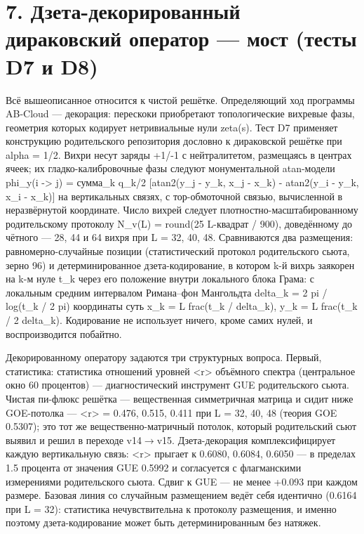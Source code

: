\documentclass[11pt,a4paper]{article}
\begin{document}
\section{7. Дзета-декорированный дираковский оператор --- мост (тесты D7 и D8)}
Всё вышеописанное относится к чистой решётке. Определяющий ход программы AB-Cloud --- декорация: перескоки приобретают топологические вихревые фазы, геометрия которых кодирует нетривиальные нули zeta(s). Тест D7 применяет конструкцию родительского репозитория дословно к дираковской решётке при alpha = 1/2. Вихри несут заряды +1/-1 с нейтралитетом, размещаясь в центрах ячеек; их гладко-калибровочные фазы следуют монументальной atan-модели phi\_\allowbreak{}y(i -> j) = сумма\_\allowbreak{}k q\_\allowbreak{}k/2 [atan2(y\_\allowbreak{}j - y\_\allowbreak{}k, x\_\allowbreak{}j - x\_\allowbreak{}k) - atan2(y\_\allowbreak{}i - y\_\allowbreak{}k, x\_\allowbreak{}i - x\_\allowbreak{}k)] на вертикальных связях, с тор-обмоточной связью, вычисленной в неразвёрнутой координате. Число вихрей следует плотностно-масштабированному родительскому протоколу N\_\allowbreak{}v(L) = round(25 L-квадрат / 900), доведённому до чётного --- 28, 44 и 64 вихря при L = 32, 40, 48. Сравниваются два размещения: равномерно-случайные позиции (статистический протокол родительского сьюта, зерно 96) и детерминированное дзета-кодирование, в котором k-й вихрь заякорен на k-м нуле t\_\allowbreak{}k через его положение внутри локального блока Грама: с локальным средним интервалом Римана--фон Мангольдта delta\_\allowbreak{}k = 2 pi / log(t\_\allowbreak{}k / 2 pi) координаты суть x\_\allowbreak{}k = L frac(t\_\allowbreak{}k / delta\_\allowbreak{}k), y\_\allowbreak{}k = L frac(t\_\allowbreak{}k / 2 delta\_\allowbreak{}k). Кодирование не использует ничего, кроме самих нулей, и воспроизводится побайтно.

Декорированному оператору задаются три структурных вопроса. Первый, статистика: статистика отношений уровней <r> объёмного спектра (центральное окно 60 процентов) --- диагностический инструмент GUE родительского сьюта. Чистая пи-флюкс решётка --- вещественная симметричная матрица и сидит ниже GOE-потолка --- <r> = 0.476, 0.515, 0.411 при L = 32, 40, 48 (теория GOE 0.5307); это тот же вещественно-матричный потолок, который родительский сьют выявил и решил в переходе v14$\to$v15. Дзета-декорация комплексифицирует каждую вертикальную связь: <r> прыгает к 0.6080, 0.6084, 0.6050 --- в пределах 1.5 процента от значения GUE 0.5992 и согласуется с флагманскими измерениями родительского сьюта. Сдвиг к GUE --- не менее +0.093 при каждом размере. Базовая линия со случайным размещением ведёт себя идентично (0.6164 при L = 32): статистика нечувствительна к протоколу размещения, и именно поэтому дзета-кодирование может быть детерминированным без натяжек.
\end{document}
